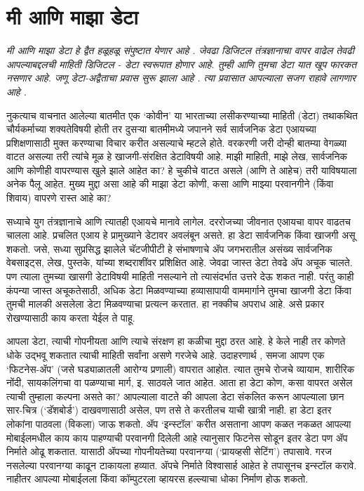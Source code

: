 \chapter{मी आणि माझा डेटा}

{\textit{मी आणि माझा डेटा हे द्वैत हळूहळू संपुष्टात येणार आहे .  जेवढा डिजिटल तंत्रज्ञानाचा वापर वाढेल तेवढी आपल्याबद्दलची माहिती डिजिटल - डेटा स्वरूपात होणार आहे. तुम्ही आणि तुमचा डेटा  यात खूप फारकत नसणार आहे. जणू डेटा-अद्वैताचा प्रवास सुरू झाला आहे .  त्या प्रवासात आपल्याला सजग राहावे लागणार आहे . }}

\vspace{1.5em}

नुकत्याच वाचनात आलेल्या बातमीत एक  `कोवीन' या भारताच्या लसीकरण्याच्या माहिती (डेटा) तथाकथित चौर्यकर्माच्या शक्यतेविषयी होती तर दुसऱ्या बातमीमध्ये जपानने सर्व सार्वजनिक डेटा एआयच्या प्रशिक्षणासाठी मुक्त करण्याचा विचार करीत असल्याचे म्हटले होते. वरकरणी जरी दोन्ही बातम्या वेगळ्या वाटत असल्या तरी त्यांचे मूळ हे खाजगी-संरक्षित डेटाविषयी आहे. माझी माहिती, माझे लेख, सार्वजनिक आणि कोणीही वापरण्यास खुले झाले आहेत का? हे चुकीचे वाटत असले (आणि ते आहेच) तरी याविषयाला अनेक पैलू आहेत. मुख्य मुद्दा असा आहे की माझा डेटा कोणी, कसा आणि माझ्या परवानगीने (किंवा शिवाय) वापरणे रास्त आहे का?

सध्याचे युग तंत्रज्ञानाचे आणि त्यातही एआयचे मानावे लागेल. दररोजच्या जीवनात एआयचा वापर वाढतच चालला आहे. प्रचलित एआय हे प्रामुख्याने डेटावर अवलंबून असते. हा डेटा सार्वजनिक किंवा खाजगी असू शकतो. जसे, सध्या सुप्रसिद्ध झालेले चॅटजीपीटी हे संभाषणाचे ॲप जगभरातील असंख्य सार्वजनिक वेबसाइट्स, लेख, पुस्तके, यांच्या शब्दराशींवर प्रशिक्षित आहे. जेवढा जास्त डेटा तेवढे ॲप अचूक चालते. पण त्याला तुमच्या खासगी डेटाविषयी माहिती नसल्याने तो त्यासंदर्भात उत्तरे देऊ शकत नाही. परंतु काही कंपन्या जास्त अचूकतेसाठी, अधिक डेटा मिळवण्याच्या हव्यासापायी वाममार्गाने तुमचा खाजगी डेटा किंवा तुमची मालकी असलेला डेटा मिळवण्याचा प्रत्यत्न करतात. हा नक्कीच अपराध आहे. असे प्रकार रोखण्यासाठी काय करता येईल  ते पाहू.

आपला डेटा, त्याची गोपनीयता आणि त्याचे संरक्षण हा कळीचा मुद्दा ठरत आहे. हे केले नाही तर कोणते धोके उद्भवू शकतात त्याची माहिती सर्वांना असणे गरजेचे आहे. उदाहरणार्थ , समजा आपण एक `फिटनेस-ॲप' (जसे घड्याळातली आरोग्य प्रणाली) वापरात आहोत. त्यात तुमचे रोजचे व्यायाम, शारीरिक नोंदी, सायकलिंगचा वा पळण्याचा मार्ग, इ. साठवले जात आहेत. आता हा डेटा कोण, कसा वापरत असेल त्याची तुम्हाला कल्पना असते का? आपल्याला वाटते की आपला डेटा संकलित करून आपल्याला छान सार-चित्र (`डॅशबोर्ड') दाखवणासाठी असेल, पण तसे ते करतीलच याची खात्री नाही. हा डेटा इतर लोकांना पाठवला (विकला) जाऊ शकतो. ॲप `इन्स्टॉल' करीत असताना आपण कळत नकळत आपल्या मोबाईलमधील काय काय पाहण्याची परवानगी दिलेली आहे त्यानुसार फिटनेस सोडून इतर डेटा पण ॲप निर्माते ओढू शकतात. यासाठी ॲपच्या गोपनीयतेच्या परवानग्या (`प्रायव्हसी सेटिंग') तपासावे. गरज नसलेल्या परवानग्या काढून टाकायला हव्यात. ॲपचे निर्माते विश्वासार्ह आहेत हे तपासूनच इन्स्टॉल करावे. नाहीतर आपल्या मोबाईलला किंवा कॉम्पुटरला व्हायरस हल्ल्याचा धोका निर्माण होऊ शकतो.

